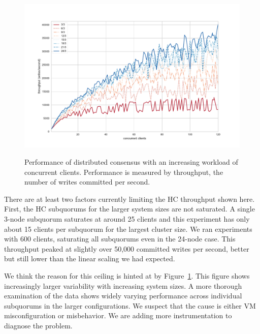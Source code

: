 \begin{figure}
    \begin{center}
        \includegraphics[width=5in]{figures/ch03_hc_throughput_workload.pdf}
    \end{center}
    \renewcommand{\baselinestretch}{1}
    \small\normalsize

    \begin{quote}
        \caption[HC Throughput vs. Workload in the Wide Area]{Performance of distributed consensus with an increasing workload of concurrent clients. Performance is measured by throughput, the number of writes committed per second.}
        \label{fig:ch03_hc_throughput_workload}
    \end{quote}
\end{figure}
\renewcommand{\baselinestretch}{2}
\small\normalsize

There are at least two factors currently limiting the HC throughput shown here.
First, the HC subquorums for the larger system sizes are not saturated.
A single 3-node subquorum saturates at around 25 clients and this experiment has only about 15 clients per subquorum for the largest cluster size.
We ran experiments with 600 clients, saturating all subquorums even in the 24-node case.
This throughput peaked at slightly over 50,000 committed writes per second, better but still lower than the linear scaling we had expected.

We think the reason for this ceiling is hinted at by Figure~\ref{fig:ch03_hc_throughput_workload}.
This figure shows increasingly larger variability with increasing system sizes.
A more thorough examination of the data shows widely varying performance across individual subquorums in the larger configurations.
We suspect that the cause is either VM misconfiguration or misbehavior.
We are adding more instrumentation to diagnose the problem.

